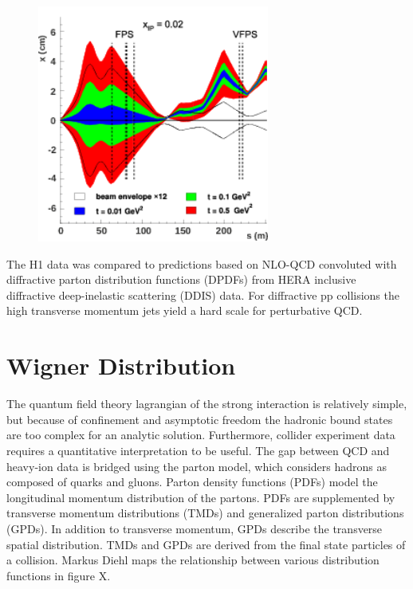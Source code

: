 \begin{figure}[h!]
\begin{centering}
\includegraphics[width=3in]{Chapter2/importfigs/fig7_h1_2015.png}
\par\end{centering}
\end{figure}

The H1 data was compared to predictions based on NLO-QCD convoluted with diffractive parton distribution functions (DPDFs) from HERA inclusive diffractive deep-inelastic scattering (DDIS) data. For diffractive pp collisions the high transverse momentum jets yield a hard scale for perturbative QCD. 

\section{Wigner Distribution}

The quantum field theory lagrangian of the strong interaction is relatively simple, but because of confinement and asymptotic freedom the hadronic bound states are too complex for an analytic solution. Furthermore, collider experiment data requires a quantitative interpretation to be useful. The gap between QCD and heavy-ion data is bridged using the parton model, which considers hadrons as composed of quarks and gluons. Parton density functions (PDFs) model the longitudinal momentum distribution of the partons. PDFs are supplemented by transverse momentum distributions (TMDs) and generalized parton distributions (GPDs). In addition to transverse momentum, GPDs describe the transverse spatial distribution. TMDs and GPDs are derived from the final state particles of a collision. Markus Diehl maps the relationship between various distribution functions in figure X.

